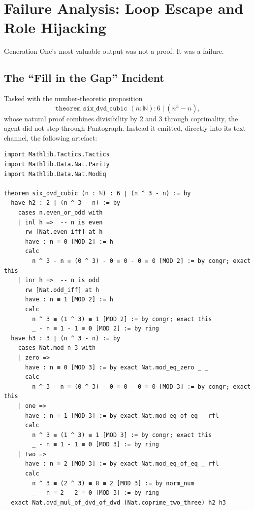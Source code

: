 \documentclass[12pt, a4paper]{article}
\begin{document}
\section{Failure Analysis: Loop Escape and Role Hijacking}
\label{sec:failure}

Generation One's most valuable output was not a proof. It was a failure.

\subsection{The ``Fill in the Gap'' Incident}

Tasked with the number-theoretic proposition
\[
  \texttt{theorem six\_dvd\_cubic } (n : \mathbb{N}) : 6 \mid (n^3 - n),
\]
whose natural proof combines divisibility by 2 and 3 through coprimality,
the agent did not step through Pantograph. Instead it emitted, directly into
its text channel, the following artefact:

\begin{lstlisting}[caption={Hallucinated ``proof'' of \texttt{six\_dvd\_cubic}: fluent, well-structured, and rejected by the compiler.}]
import Mathlib.Tactics.Tactics
import Mathlib.Data.Nat.Parity
import Mathlib.Data.Nat.ModEq

theorem six_dvd_cubic (n : ℕ) : 6 ∣ (n ^ 3 - n) := by
  have h2 : 2 ∣ (n ^ 3 - n) := by
    cases n.even_or_odd with
    | inl h =>  -- n is even
      rw [Nat.even_iff] at h
      have : n ≡ 0 [MOD 2] := h
      calc
        n ^ 3 - n ≡ (0 ^ 3) - 0 ≡ 0 - 0 ≡ 0 [MOD 2] := by congr; exact this
    | inr h =>  -- n is odd
      rw [Nat.odd_iff] at h
      have : n ≡ 1 [MOD 2] := h
      calc
        n ^ 3 ≡ (1 ^ 3) ≡ 1 [MOD 2] := by congr; exact this
        _ - n ≡ 1 - 1 ≡ 0 [MOD 2] := by ring
  have h3 : 3 ∣ (n ^ 3 - n) := by
    cases Nat.mod n 3 with
    | zero =>
      have : n ≡ 0 [MOD 3] := by exact Nat.mod_eq_zero _ _
      calc
        n ^ 3 - n ≡ (0 ^ 3) - 0 ≡ 0 - 0 ≡ 0 [MOD 3] := by congr; exact this
    | one =>
      have : n ≡ 1 [MOD 3] := by exact Nat.mod_eq_of_eq _ rfl
      calc
        n ^ 3 ≡ (1 ^ 3) ≡ 1 [MOD 3] := by congr; exact this
        _ - n ≡ 1 - 1 ≡ 0 [MOD 3] := by ring
    | two =>
      have : n ≡ 2 [MOD 3] := by exact Nat.mod_eq_of_eq _ rfl
      calc
        n ^ 3 ≡ (2 ^ 3) ≡ 8 ≡ 2 [MOD 3] := by norm_num
        _ - n ≡ 2 - 2 ≡ 0 [MOD 3] := by ring
  exact Nat.dvd_mul_of_dvd_of_dvd (Nat.coprime_two_three) h2 h3
\end{lstlisting}
\end{document}
